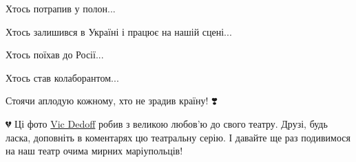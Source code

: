 Хтось потрапив у полон...

Хтось залишився в Україні і працює на нашій сцені... 

Хтось поїхав до Росії...

Хтось став колаборантом...

Стоячи аплодую кожному, хто не зрадив країну! ❣️

💔 Ці фото \href{https://www.facebook.com/vic.dedoff}{Vic Dedoff} робив з
великою любов'ю до свого театру. Друзі, будь ласка, доповніть в коментарях цю
театральну серію. І давайте ще раз подивимося на наш театр очима мирних
маріупольців!


